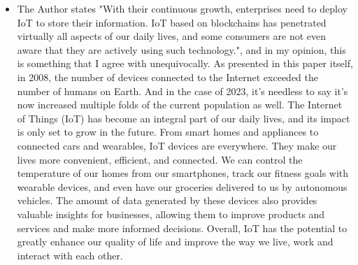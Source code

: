 \documentclass{article}
\begin{document}
\begin{itemize}
    \item The Author states "With their continuous growth, enterprises need to deploy IoT to store their information. IoT based on blockchains has penetrated virtually all aspects of our daily lives, and some consumers are not even aware that they are actively using such technology.", and in my opinion, this is something that I agree with unequivocally. As presented in this paper itself, in 2008, the number of devices connected to the Internet exceeded the number of humans on Earth. And in the case of 2023, it's needless to say it's now increased multiple folds of the current population as well. The Internet of Things (IoT) has become an integral part of our daily lives, and its impact is only set to grow in the future. From smart homes and appliances to connected cars and wearables, IoT devices are everywhere. They make our lives more convenient, efficient, and connected. We can control the temperature of our homes from our smartphones, track our fitness goals with wearable devices, and even have our groceries delivered to us by autonomous vehicles. The amount of data generated by these devices also provides valuable insights for businesses, allowing them to improve products and services and make more informed decisions. Overall, IoT has the potential to greatly enhance our quality of life and improve the way we live, work and interact with each other.


\end{itemize}
\end{document}
